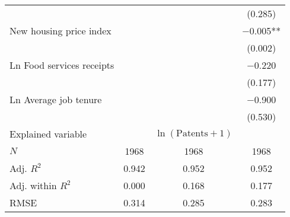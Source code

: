 \begin{tabular}[t]{lccc}
 &  &  & (\num{0.285})\\
New housing price index &  &  & \num{-0.005}**\\
 &  &  & (\num{0.002})\\
Ln Food services receipts &  &  & \num{-0.220}\\
 &  &  & (\num{0.177})\\
Ln Average job tenure &  &  & \num{-0.900}\\
 &  &  & (\num{0.530})\\
\midrule
Explained variable &  & $\ln(\text{Patents}+1)$ & \\
$N$ & \num{1968} & \num{1968} & \num{1968}\\
Adj. $R^2$ & \num{0.942} & \num{0.952} & \num{0.952}\\
Adj. within $R^2$ & \num{0.000} & \num{0.168} & \num{0.177}\\
RMSE & \num{0.314} & \num{0.285} & \num{0.283}\\
\bottomrule
\end{tabular}
